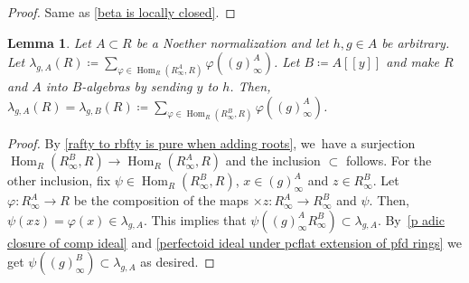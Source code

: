 \documentclass[JEP,XML,SOM,Unicode,published]{cedram}
\let\autoref\cref
\theoremstyle{plain}
\newtheorem{lemma}[theorem]{Lemma}
\theoremstyle{definition}
\numberwithin{equation}{theorem}
\DeclareMathOperator{\Hom}{Hom}
\newcommand{\llbracket}{[\![}
\newcommand{\rrbracket}{]\!]}
\renewcommand{\phi}{\varphi}
\newcommand{\rafty}{R^A_\infty}
\newcommand{\rbfty}{R^B_\infty}
\begin{document}
\begin{proof}
Same as \autoref{beta is locally closed}.
\end{proof}

\begin{lemma}\label{trace does not depend on choice of A}
Let $A\subset R$ be a Noether normalization and let $h,g\in A$ be arbitrary. Let $\lambda_{g,A}(R)\coloneqq \sum_{\phi\in \Hom_R\left(\rafty,R\right)}\phi\left((g)^A_\infty\right)$. Let $B\coloneqq A\llbracket y\rrbracket$ and make $R$ and $A$ into $B$\nobreakdash-algebras by sending $y$ to $h$. Then, $\lambda_{g,A}(R)=\lambda_{g,B}(R)\coloneqq \sum_{\phi\in \Hom_R\left(\rbfty,R\right)}\phi\left((g)^A_\infty\right)$.
\end{lemma}

\begin{proof}
By \autoref{rafty to rbfty is pure when adding roots}, we~have a surjection $\Hom_R(\rbfty,R)\to \Hom_R(\rafty,R)$ and the inclusion $\subset$ follows. For the other inclusion, fix $\psi\in \Hom_R(\rbfty,R)$, $x\in (g)^A_\infty$ and $z\in \rbfty$. Let $\phi\colon \rafty\to R$ be the composition of the maps $\times z\colon \rafty\to \rbfty$ and $\psi$. Then, $\psi(xz)=\phi(x)\in \lambda_{g,A}$. This implies that $\psi((g)^A_\infty \rbfty)\subset \lambda_{g,A}$. By~\autoref{p adic closure of comp ideal} and \autoref{perfectoid ideal under pcflat extension of pfd rings} we get $\psi((g)^B_\infty)\subset \lambda_{g,A}$ as desired.
\end{proof}
\end{document}
